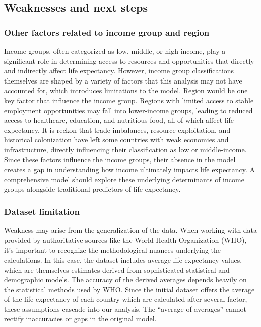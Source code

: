 \documentclass[
  letterpaper,
  DIV=11,
  numbers=noendperiod]{scrartcl}
\begin{document}
\subsection{Weaknesses and next steps}\label{weaknesses-and-next-steps}

\subsubsection{Other factors related to income group and
region}\label{other-factors-related-to-income-group-and-region}

Income groups, often categorized as low, middle, or high-income, play a
significant role in determining access to resources and opportunities
that directly and indirectly affect life expectancy. However, income
group classifications themselves are shaped by a variety of factors that
this analysis may not have accounted for, which introduces limitations
to the model. Region would be one key factor that influence the income
group. Regions with limited access to stable employment opportunities
may fall into lower-income groups, leading to reduced access to
healthcare, education, and nutritious food, all of which affect life
expectancy. It is reckon that trade imbalances, resource exploitation,
and historical colonization have left some countries with weak economies
and infrastructure, directly influencing their classification as low or
middle-income. Since these factors influence the income groups, their
absence in the model creates a gap in understanding how income
ultimately impacts life expectancy. A comprehensive model should explore
these underlying determinants of income groups alongside traditional
predictors of life expectancy.

\subsubsection{Dataset limitation}\label{dataset-limitation}

Weakness may arise from the generalization of the data. When working
with data provided by authoritative sources like the World Health
Organization (WHO), it's important to recognize the methodological
nuances underlying the calculations. In this case, the dataset includes
average life expectancy values, which are themselves estimates derived
from sophisticated statistical and demographic models. The accuracy of
the derived averages depends heavily on the statistical methods used by
WHO. Since the initial dataset offers the average of the life expectancy
of each country which are calculated after several factor, these
assumptions cascade into our analysis. The ``average of averages''
cannot rectify inaccuracies or gaps in the original model.
\end{document}
